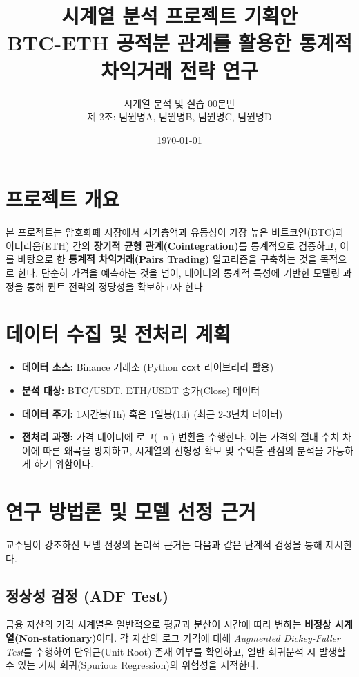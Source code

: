 \documentclass[11pt, a4paper]{article}
\title{\textbf{시계열 분석 프로젝트 기획안} \\ \Large BTC-ETH 공적분 관계를 활용한 통계적 차익거래 전략 연구}
\author{시계열 분석 및 실습 00분반 \\ [1ex] 제 2조: 팀원명A, 팀원명B, 팀원명C, 팀원명D}
\date{\today}
\begin{document}
	
	\maketitle
	
	\section{프로젝트 개요}
	본 프로젝트는 암호화폐 시장에서 시가총액과 유동성이 가장 높은 비트코인(BTC)과 이더리움(ETH) 간의 \textbf{장기적 균형 관계(Cointegration)}를 통계적으로 검증하고, 이를 바탕으로 한 \textbf{통계적 차익거래(Pairs Trading)} 알고리즘을 구축하는 것을 목적으로 한다. 단순히 가격을 예측하는 것을 넘어, 데이터의 통계적 특성에 기반한 모델링 과정을 통해 퀀트 전략의 정당성을 확보하고자 한다.
	
	\section{데이터 수집 및 전처리 계획}
	\begin{itemize}
		\item \textbf{데이터 소스:} Binance 거래소 (Python \texttt{ccxt} 라이브러리 활용)
		\item \textbf{분석 대상:} BTC/USDT, ETH/USDT 종가(Close) 데이터
		\item \textbf{데이터 주기:} 1시간봉(1h) 혹은 1일봉(1d) (최근 2-3년치 데이터)
		\item \textbf{전처리 과정:} 가격 데이터에 로그($\ln$) 변환을 수행한다. 이는 가격의 절대 수치 차이에 따른 왜곡을 방지하고, 시계열의 선형성 확보 및 수익률 관점의 분석을 가능하게 하기 위함이다.
	\end{itemize}
	
	\section{연구 방법론 및 모델 선정 근거}
	교수님이 강조하신 모델 선정의 논리적 근거는 다음과 같은 단계적 검정을 통해 제시한다.
	
	\subsection{정상성 검정 (ADF Test)}
	금융 자산의 가격 시계열은 일반적으로 평균과 분산이 시간에 따라 변하는 \textbf{비정상 시계열(Non-stationary)}이다. 각 자산의 로그 가격에 대해 \textit{Augmented Dickey-Fuller Test}를 수행하여 단위근(Unit Root) 존재 여부를 확인하고, 일반 회귀분석 시 발생할 수 있는 가짜 회귀(Spurious Regression)의 위험성을 지적한다.
	
\end{document}
